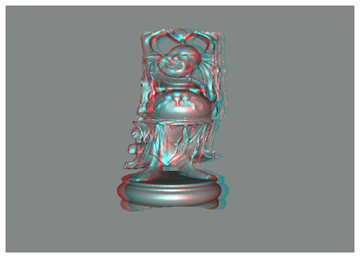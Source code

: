 \documentclass{beamer}
\begin{document}
\begin{frame} 
\includegraphics[scale=0.55]{happy_dubois.png}

\end{frame}

\end{document}
